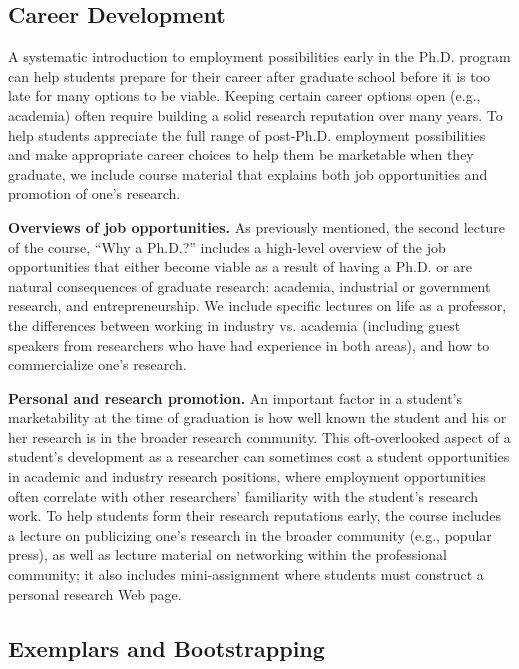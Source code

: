 \subsection{Career Development}

A systematic introduction to employment possibilities early in the
Ph.D. program can help students prepare for their career after graduate
school before it is too late for many options to be viable.  Keeping
certain career options open (e.g., academia) often require building a
solid research reputation over many years.  To help students appreciate
the full range of post-Ph.D. employment possibilities and make
appropriate career choices to help them be marketable when they
graduate, we include course material that explains both job
opportunities and promotion of one's research.

\vspace*{0.1in}
\noindent
{\bf Overviews of job opportunities.}  As previously mentioned, the
second lecture of the course, ``Why a Ph.D.?'' includes a high-level
overview of the job opportunities that either become viable as a result
of having a Ph.D. or are natural consequences of graduate research:
academia, industrial or government research, and entrepreneurship.  We
include specific lectures on life as a professor, the differences
between working in industry vs. academia (including guest speakers from
researchers who have had experience in both areas), and how to
commercialize one's research.  

\vspace*{0.1in}
\noindent
{\bf Personal and research promotion.}  An important factor in a
student's marketability at the time of graduation is how well known the
student and his or her research is in the broader research community.
This oft-overlooked aspect of a student's development as a researcher
can sometimes cost a student opportunities in academic and industry
research positions, where employment opportunities often correlate with
other researchers' familiarity with the student's research work.  To
help students form their research reputations early, the course includes
a lecture on publicizing one's research in the broader community (e.g.,
popular press), as well as lecture material on networking within the
professional community; it also includes mini-assignment where students
must construct a personal research Web page.

\subsection{Exemplars and Bootstrapping}

